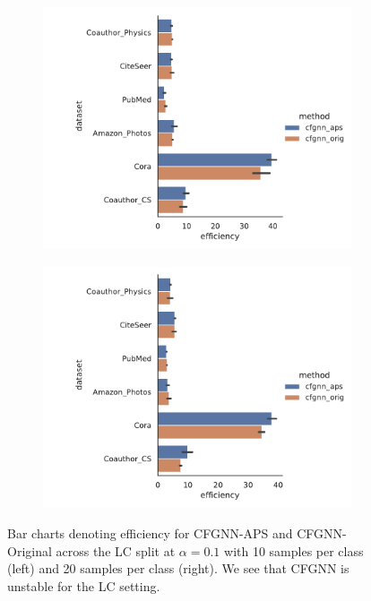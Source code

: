 \begin{figure}
    \centering
    \begin{subfigure}{0.48\linewidth}
        \includegraphics[width=\linewidth,alt={Bar charts denoting efficiency for CFGNN-APS and CFGNN-Original across the LC split at $\alpha=0.1$ with 10 samples per  class.}]{graphConformal/figures/nspc/cfgnn_aps_vs_orig_efficiency_10}
    \end{subfigure}
    \begin{subfigure}{0.48\linewidth}
        \includegraphics[width=\linewidth, alt={Bar charts denoting efficiency for CFGNN-APS and CFGNN-Original across the LC split at $\alpha=0.1$ with 20 samples per  class.}]{graphConformal/figures/nspc/cfgnn_aps_vs_orig_efficiency_20}
    \end{subfigure}
    \caption{Bar charts denoting efficiency for CFGNN-APS and CFGNN-Original across the LC split at $\alpha=0.1$ with 10 samples per  class (left) and 20 samples per class (right). We see that CFGNN is unstable for the LC setting.}
    \label{fig:nspc:conformal:cfgnn_aps_vs_orig}
\end{figure}

